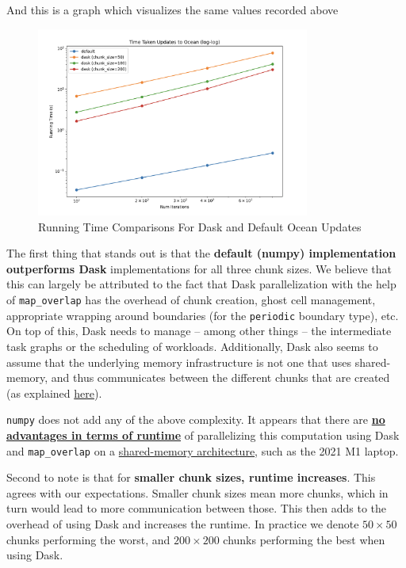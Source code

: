 \documentclass[a4paper,12pt]{article}
\begin{document}
And this is a graph which visualizes the same values recorded above

\begin{figure}[H]
  \centering
  \includegraphics[width=0.8\textwidth]{../images/bonus_default_dask_runtimes.png}
  \caption{Running Time Comparisons For Dask and Default Ocean Updates}
\end{figure}

The first thing that stands out is that the \textbf{default (numpy) implementation outperforms Dask} implementations for all three chunk sizes.
We believe that this can largely be attributed to the fact that Dask parallelization with the help of \verb|map_overlap| has the overhead of chunk creation, ghost cell management, appropriate wrapping around boundaries (for the \verb|periodic| boundary type), etc.
On top of this, Dask needs to manage -- among other things -- the intermediate task graphs or the scheduling of workloads.
Additionally, Dask also seems to assume that the underlying memory infrastructure is not one that uses shared-memory, and thus communicates between the different chunks that are created (as explained \href{https://canvas.kth.se/courses/52247/discussion_topics/452810}{here}). 

\verb|numpy| does not add any of the above complexity.
It appears that there are \textbf{\underline{no advantages in terms of runtime}} of parallelizing this computation using Dask and \verb|map_overlap| on a \underline{shared-memory architecture}, such as the 2021 M1 laptop. 

Second to note is that for \textbf{smaller chunk sizes, runtime increases}.
This agrees with our expectations.
Smaller chunk sizes mean more chunks, which in turn would lead to more communication between those.
This then adds to the overhead of using Dask and increases the runtime.
In practice we denote $50 \times 50$ chunks performing the worst, and $200 \times 200$ chunks performing the best when using Dask.
\end{document}
